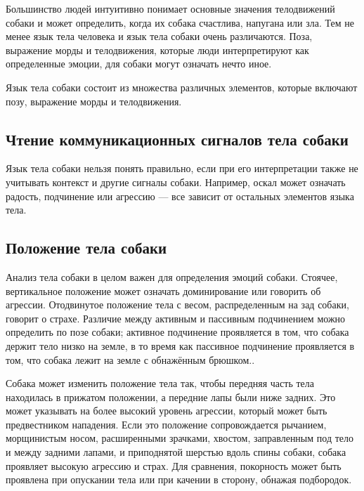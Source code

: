 
Большинство людей интуитивно понимает основные значения телодвижений собаки и может определить, когда их собака счастлива, напугана или зла. Тем не менее язык тела человека и язык тела собаки очень различаются. Поза, выражение морды и телодвижения, которые люди интерпретируют как определенные эмоции, для собаки могут означать нечто иное. 

Язык тела собаки состоит из множества различных элементов, которые включают позу, выражение морды и телодвижения.

\subsection{Чтение коммуникационных сигналов тела собаки}

Язык тела собаки нельзя понять правильно, если при его интерпретации также не учитывать контекст и другие сигналы собаки. Например, оскал может означать радость, подчинение или агрессию — все зависит от остальных элементов языка тела.

\subsection{Положение тела собаки}

Анализ тела собаки в целом важен для определения эмоций собаки. Стоячее, вертикальное положение может означать доминирование или говорить об агрессии. Отодвинутое положение тела с весом, распределенным на зад собаки, говорит о страхе.\cite{Simpson1997}\cite{interpretation} Различие между активным и пассивным подчинением можно определить по позе собаки; активное подчинение проявляется в том, что собака держит тело низко на земле, в то время как пассивное подчинение проявляется в том, что собака лежит на земле с обнажённым брюшком.\cite{The_Domestic_Dog}.

Собака может изменить положение тела так, чтобы передняя часть тела находилась в прижатом положении, а передние лапы были ниже задних. Это может указывать на более высокий уровень агрессии, который может быть предвестником нападения. Если это положение сопровождается рычанием, морщинистым носом, расширенными зрачками, хвостом, заправленным под тело и между задними лапами, и приподнятой шерстью вдоль спины собаки, собака проявляет высокую агрессию и страх.\cite{speak_dog} Для сравнения, покорность может быть проявлена при опускании тела или при качении в сторону, обнажая подбородок.


